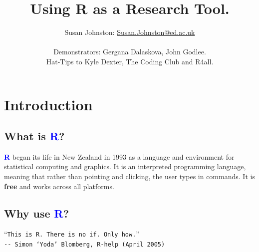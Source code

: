 \documentclass[a4paper,12pt]{article}
\newcommand\boldblue[1]{\textcolor{blue}{\textbf{#1}}}
\begin{document}





\title{Using R as a Research Tool.}
\author{Susan Johnston: \href{mailto:Susan.Johnston@ed.ac.uk}{Susan.Johnston@ed.ac.uk}  \\ \\
        Demonstrators: Gergana Dalaskova, John Godlee. \\
        Hat-Tips to Kyle Dexter, The Coding Club and R4all.}









\maketitle



\section {Introduction}

\subsection {What is \boldblue{R}?}

\boldblue{R} began its life in New Zealand in 1993 as a language and environment for statistical computing and graphics. It is an interpreted programming language, meaning that rather than pointing and clicking, the user types in commands. It is \textbf{free} and works across all platforms.


\subsection {Why use \boldblue{R}?}

\begin{center}
``\texttt{This is R. There is no if. Only how.}'' \\
\texttt{{-}{-} Simon `Yoda' Blomberg, R-help (April 2005)}

\end{center}
\end{document}
